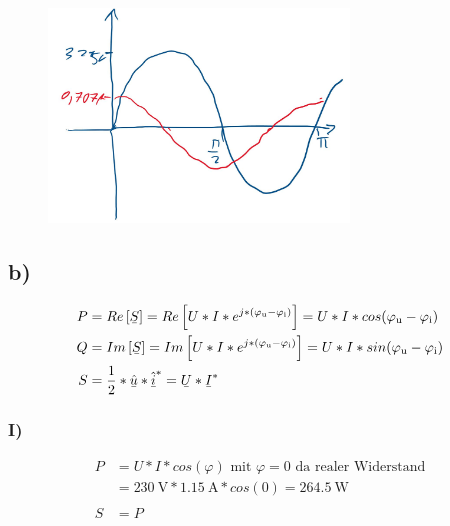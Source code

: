 \documentclass[../../document.tex]{subfiles}
\begin{document}
\begin{figure}[H]
    \begin{center}
        \includegraphics[width=8cm]{../../img/task1-a-iii.jpeg}
    \end{center}
\end{figure}

\subsection*{b)}

\begin{equation*}
    \begin{split}
        P &= Re\left[\ubar{S}\right] = Re\left[U * I * e^{j * (\varphi\cind{u} - \varphi\cind{i})}\right] = U * I * cos(\varphi\cind{u} - \varphi\cind{i})\\
        Q &= Im\left[\ubar{S}\right] = Im\left[U * I * e^{j * (\varphi\cind{u} - \varphi\cind{i})}\right] = U * I * sin(\varphi\cind{u} - \varphi\cind{i})\\
        S &= \frac{1}{2} * \ubar{\hat{u}} * \ubar{\hat{i}}^* = \ubar{U} * \ubar{I}^*
    \end{split}
\end{equation*}

\subsubsection*{I)}

\begin{equation*}
    \begin{split}
        P &= U * I * cos(\varphi) \textrm{ mit } \varphi = 0\textrm{ da realer Widerstand}\\
        &= \SI{230}{\volt} * \SI{1,15}{\ampere} * cos(0) = \SI{264,5}{\watt}\\\\
        S &= P\\
    \end{split}
\end{equation*}
\end{document}
